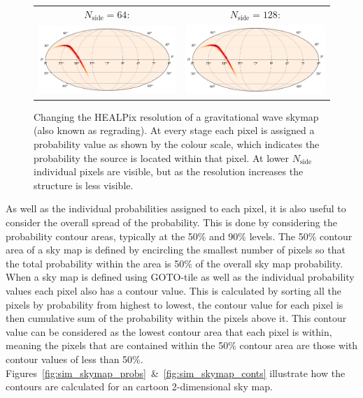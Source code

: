 \begin{colsection}
\begin{colsection}
\begin{figure}[p]
\begin{center}
\begin{tabular}{cc}
$N_\text{side} = 64$: &
$N_\text{side} = 128$:
\\

\includegraphics[width=0.45\linewidth]{images/regrade/64.png} &
\includegraphics[width=0.45\linewidth]{images/regrade/128.png}
\\

\end{tabular}

\end{center}

\caption[Regrading a gravitational wave skymap]{Changing the HEALPix resolution of a gravitational wave skymap (also known as regrading). At every stage each pixel is assigned a probability value as shown by the colour scale, which indicates the probability the source is located within that pixel. At lower $N_\text{side}$ individual pixels are visible, but as the resolution increases the structure is less visible.
}
\label{fig:skymap_regrade}
\end{figure}


\clearpage

As well as the individual probabilities assigned to each pixel, it is also useful to consider the overall spread of the probability. This is done by considering the probability contour areas, typically at the 50\% and 90\% levels. The 50\% contour area of a sky map is defined by encircling the smallest number of pixels so that the total probability within the area is 50\% of the overall sky map probability. When a sky map is defined using GOTO-tile as well as the individual probability values each pixel also has a contour value. This is calculated by sorting all the pixels by probability from highest to lowest, the contour value for each pixel is then cumulative sum of the probability within the pixels above it. This contour value can be considered as the lowest contour area that each pixel is within, meaning the pixels that are contained within the 50\% contour area are those with contour values of less than 50\%. Figures~\ref{fig:sim_skymap_probs}~\&~\ref{fig:sim_skymap_conts} illustrate how the contours are calculated for an cartoon 2-dimensional sky map.


\end{colsection}
\end{colsection}
